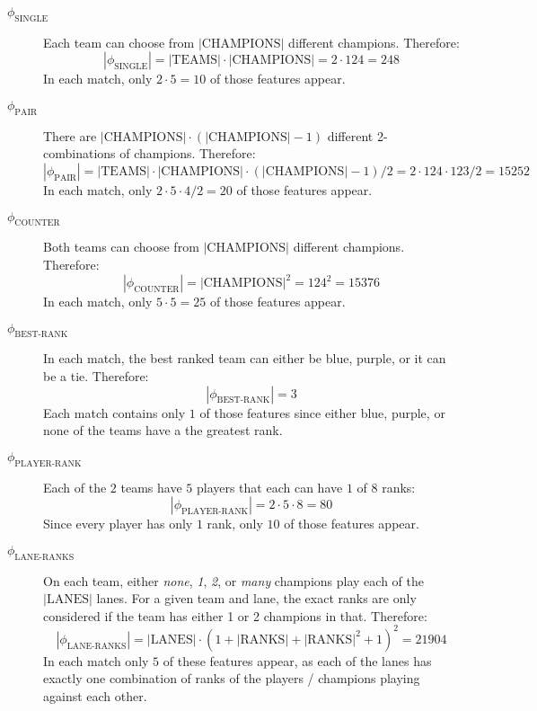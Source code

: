 \begin{description}
\item[{$\phi_{\text{SINGLE}}$}]\hfill
 
Each team can choose from $|\text{CHAMPIONS}|$ different champions. Therefore:
    \[|\phi_{\text{SINGLE}}| = |\text{TEAMS}| \cdot |\text{CHAMPIONS}| = 2 \cdot 124 = 248\] In each match, only $2 \cdot 5 = 10$ of those features appear.


\item[{$\phi_{\text{PAIR}}$}]\hfill

There are $|\text{CHAMPIONS}| \cdot (|\text{CHAMPIONS}|-1)$ different 2-combinations of champions. Therefore:
    \[|\phi_{\text{PAIR}}| = |\text{TEAMS}| \cdot |\text{CHAMPIONS}| \cdot (|\text{CHAMPIONS}|-1) / 2 = 2 \cdot 124 \cdot 123 / 2 = 15252\] In each match, only $2 \cdot 5 \cdot 4 / 2 = 20$ of those features appear.


\item[{$\phi_{\text{COUNTER}}$}]\hfill

 Both teams can choose from $|\text{CHAMPIONS}|$ different champions. Therefore:
\[|\phi_{\text{COUNTER}}| = |\text{CHAMPIONS}|^2 = 124^2 = 15376\] 
In each match, only $5 \cdot 5 = 25$ of those features appear.


\item[{$\phi_{\text{BEST-RANK}}$}]\hfill

 In each match, the best ranked team can either be blue, purple, or it can be a tie. Therefore:
\[|\phi_{\text{BEST-RANK}}| = 3\] 
Each match contains only $1$ of those features since either blue, purple, or none of the teams have a the greatest rank.


\item[{$\phi_{\text{PLAYER-RANK}}$}]\hfill

Each of the $2$ teams have $5$ players that each can have $1$ of $8$ ranks:
\[|\phi_{\text{PLAYER-RANK}}| = 2 \cdot 5 \cdot 8 = 80\] 
Since every player has only $1$ rank, only $10$ of those features appear.


\item[{$\phi_{\text{LANE-RANKS}}$}]\hfill

 On each team, either \textit{none}, \textit{1}, \textit{2}, or \textit{many} champions play each of the $|\text{LANES}|$ lanes. For a given team and lane, the exact ranks are only considered if the team has either 1 or 2 champions in that. Therefore:
\[|\phi_{\text{LANE-RANKS}}| = |\text{LANES}| \cdot (1 + |\text{RANKS}| + |\text{RANKS}|^2 + 1)^2 = 21904\]
In each match only $5$ of these features appear, as each of the lanes has exactly one combination of ranks of the players / champions playing against each other.



\end{description}
